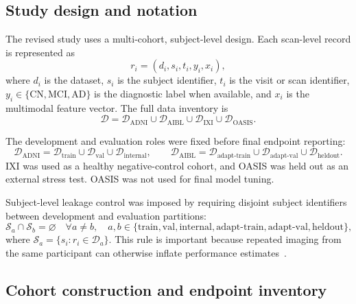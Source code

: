 \documentclass[12pt,a4paper]{article}
\begin{document}
\subsection{Study design and notation}
\label{sec:study_design}

The revised study uses a multi-cohort, subject-level design. Each scan-level record is represented as
\begin{equation}
r_i = \left(d_i, s_i, t_i, y_i, x_i\right),
\label{eq:record}
\end{equation}
where $d_i$ is the dataset, $s_i$ is the subject identifier, $t_i$ is the visit or scan identifier, $y_i \in \{\mathrm{CN},\mathrm{MCI},\mathrm{AD}\}$ is the diagnostic label when available, and $x_i$ is the multimodal feature vector. The full data inventory is
\begin{equation}
\mathcal{D} =
\mathcal{D}_{\mathrm{ADNI}} \cup
\mathcal{D}_{\mathrm{AIBL}} \cup
\mathcal{D}_{\mathrm{IXI}} \cup
\mathcal{D}_{\mathrm{OASIS}} .
\label{eq:data_union}
\end{equation}

The development and evaluation roles were fixed before final endpoint reporting:
\begin{equation}
\mathcal{D}_{\mathrm{ADNI}} =
\mathcal{D}_{\mathrm{train}} \cup
\mathcal{D}_{\mathrm{val}} \cup
\mathcal{D}_{\mathrm{internal}},
\qquad
\mathcal{D}_{\mathrm{AIBL}} =
\mathcal{D}_{\mathrm{adapt\mbox{-}train}} \cup
\mathcal{D}_{\mathrm{adapt\mbox{-}val}} \cup
\mathcal{D}_{\mathrm{heldout}} .
\label{eq:split_roles}
\end{equation}
IXI was used as a healthy negative-control cohort, and OASIS was held out as an external stress test. OASIS was not used for final model tuning.

Subject-level leakage control was imposed by requiring disjoint subject identifiers between development and evaluation partitions:
\begin{equation}
\mathcal{S}_a \cap \mathcal{S}_b = \varnothing
\quad
\forall a \neq b,\quad
a,b \in
\{\mathrm{train},\mathrm{val},\mathrm{internal},\mathrm{adapt\mbox{-}train},
\mathrm{adapt\mbox{-}val},\mathrm{heldout}\},
\label{eq:subject_disjoint}
\end{equation}
where $\mathcal{S}_a=\{s_i:r_i\in\mathcal{D}_a\}$. This rule is important because repeated imaging from the same participant can otherwise inflate performance estimates~\citep{varoquaux2017cross}.

\subsection{Cohort construction and endpoint inventory}
\label{sec:data}
\end{document}
